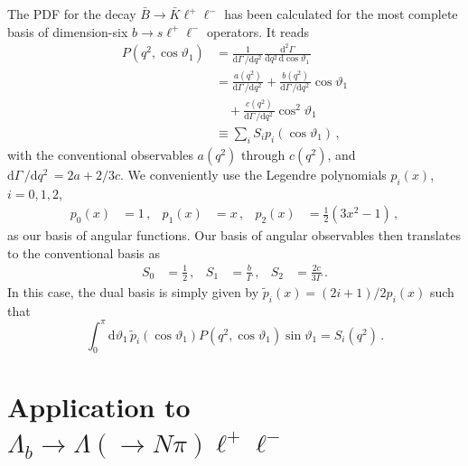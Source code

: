 \documentclass[aps,nofootinbib,preprintnumbers,prd,twocolumn]{revtex4-1}
\newcommand{\dual}[1]{\tilde{#1}}
\newcommand{\rmdx}[1]{\mbox{d} #1 \,} %
\renewcommand{\theta}{\vartheta}
\begin{document}
The PDF for the decay $\bar{B}\to\bar{K}\ell^+\ell^-$ has been calculated for the most
complete basis of dimension-six $b\to s \ell^+\ell^-$ operators. It reads \cite{Bobeth:2007dw,Bobeth:2012vn}
\begin{equation}
\begin{aligned}
    P(q^2, \cos\theta_1)
        & = \frac{1}{\rmdx{\Gamma}/\rmdx{q^2}} \frac{\rmdx{^2\Gamma}}{\rmdx{q^2} \rmdx{\cos\theta_1}}\\
        & = \frac{a(q^2)}{\rmdx{\Gamma}/\rmdx{q^2}} + \frac{b(q^2)}{\rmdx{\Gamma}/\rmdx{q^2}} \cos\theta_1\\
        & \quad + \frac{c(q^2)}{\rmdx{\Gamma}/\rmdx{q^2}} \cos^2\theta_1\\
        & \equiv \sum_i S_i p_i(\cos\theta_1)\,,
\end{aligned}
\end{equation}
with the conventional observables $a(q^2)$ through $c(q^2)$, and $\rmdx{\Gamma}/\rmdx{q^2} = 2a + 2/3 c$. We conveniently use the Legendre polynomials
$p_i(x)$, $i=0,1,2$,
\begin{equation}
\begin{aligned}
    p_0(x) & = 1\,, &
    p_1(x) & = x\,, &
    p_2(x) & = \frac{1}{2} (3x^2 - 1)\,,
\end{aligned}
\end{equation}
as our basis of angular functions. Our basis of angular observables then
translates to the conventional basis as
\begin{equation}
\begin{aligned}
    S_0 & = \frac{1}{2}\,, &
    S_1 & = \frac{b}{\Gamma}\,, &
    S_2 & = \frac{2c}{3\Gamma}\,.
\end{aligned}
\end{equation}
In this case, the dual basis is simply given by $\tilde{p}_i(x) = (2 i + 1)/2 p_i(x)$
such that
\begin{equation}
    \int_0^\pi \rmdx{\theta_1} \dual{p}_i(\cos\theta_1) P(q^2, \cos\theta_1)\sin\theta_1 = S_i(q^2)\,.
\end{equation}

\section{Application to $\Lambda_b\to \Lambda(\to N \pi)\ell^+\ell^-$}
\label{app:lambdabtolambdall}
\end{document}
